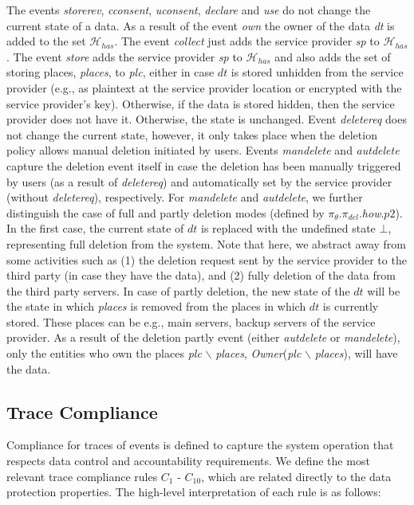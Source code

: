 \documentclass[a4paper]{article}
\begin{document}
The events \textit{storerev}, \textit{cconsent}, \textit{uconsent}, \textit{declare} and \textit{use} do not change the current state of a data. 
As a result of the event \textit{own} the owner of the data \textit{dt} is added to the set $\mathcal{H}_{has}$. The event \textit{collect} just adds the service provider \textit{sp} to $\mathcal{H}_{has}$. The event \textit{store} adds the service provider \textit{sp} to $\mathcal{H}_{has}$ and also adds  the set of storing places, \textit{places}, to \textit{plc}, either in case $dt$ is stored unhidden from the service provider (e.g., as plaintext at the service provider location or encrypted with the service provider's key). Otherwise, if the data is stored hidden, then the service provider does not have it. Otherwise, the state is unchanged. Event \textit{deletereq} does not change the current state, however, it only takes place when the deletion policy allows manual deletion initiated by users. Events \textit{mandelete} and  \textit{autdelete} capture the deletion event itself in case the deletion has been manually triggered by users (as a result of \textit{deletereq}) and automatically set by the service provider (without \textit{deletereq}), respectively.  For \textit{mandelete} and  \textit{autdelete}, we further distinguish the case of full and partly deletion modes (defined by $\pi_{\theta}$.$\pi_{del}$.\textit{how}.$p2$). In the first case, the current state of $dt$ is  replaced with the undefined state $\bot$, representing full deletion from the system. Note that here, we abstract away from some activities such as (1) the deletion request sent by the service provider to the third party (in case they have the data), and (2)  fully deletion of the data from the third party servers. In case of partly deletion, the new state of the $dt$ will be the state in which \textit{places} is removed from the places in which  $dt$ is currently stored. These places can be e.g., main servers, backup servers of the service provider. As a result of the deletion partly event (either \textit{autdelete} or \textit{mandelete}), only the entities who own the places \textit{plc} $\backslash$ \textit{places}, \textit{Owner}(\textit{plc} $\backslash$ \textit{places}), will have the data.    


\subsection{Trace Compliance}
\label{sec:compliance0}

Compliance for traces of events is defined to capture the system operation that respects data control and accountability requirements.  
We define the most relevant trace compliance rules $C_1$ - $C_{10}$, which are related directly to the data protection properties. 
The high-level interpretation of each rule is as follows: 
\end{document}
